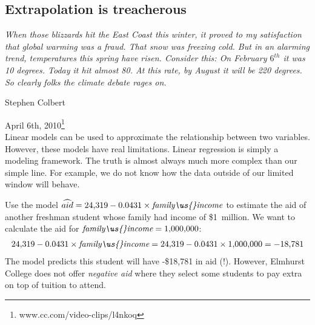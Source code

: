 

\D{\newpage}

\subsection{Extrapolation is treacherous}


{\em\small When those blizzards hit the East Coast this winter,
it proved to my satisfaction that global warming was a fraud.
That snow was freezing cold.
But in an alarming trend, temperatures this spring have risen.
Consider this: On February $6^{th}$ it was 10 degrees.
Today it hit almost 80. At this rate, by August it will be
220 degrees.
So clearly folks the climate debate rages on.\vspace{0.5mm}}

\noindent\hspace{\textwidth}\hspace{-40mm}Stephen Colbert

\noindent\hspace{\textwidth}\hspace{-40mm}April 6th,
2010\footnote{
    {www.cc.com/video-clips/l4nkoq}} \\

Linear models can be used to approximate the relationship
between two variables.
However, these models have real limitations.
Linear regression is simply a modeling framework.
The truth is almost always much more complex than our simple line.
For example, we do not know how the data outside of our limited
window will behave.

\begin{examplewrap}
\begin{nexample}{Use the model
    $\widehat{aid}
      = \text{24,319} - 0.0431 \times
          \textit{family\us{}income}$
    to estimate the aid of another freshman student whose
    family had income of \$1~million.}
  We want to calculate the aid for
  $\textit{family\us{}income} = \text{1,000,000}$:
  \begin{align*}
  \text{24,319} - 0.0431\times \textit{family\us{}income}
    = \text{24,319} - 0.0431\times \text{1,000,000}
    = -\text{18,781}
  \end{align*}
  The model predicts this student will have -\$18,781 in aid (!).
  However, Elmhurst College does not offer \emph{negative aid}
  where they select some students to pay extra on top of tuition
  to attend.
\end{nexample}
\end{examplewrap}


